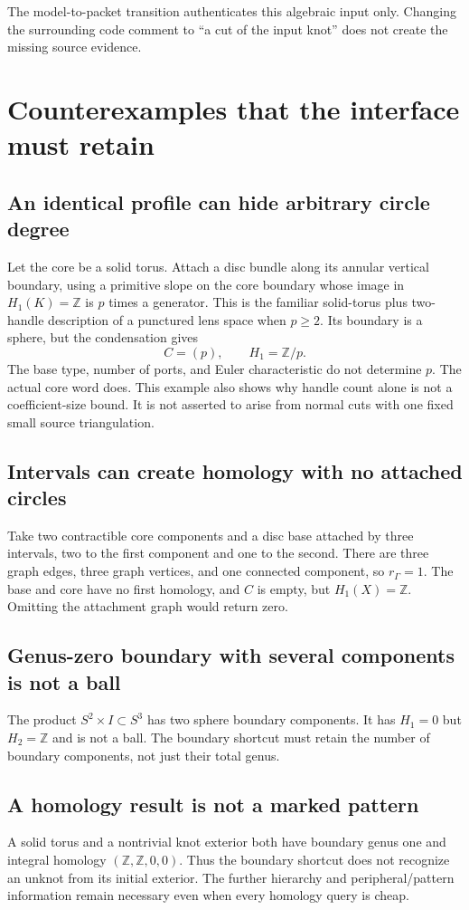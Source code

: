 \documentclass[11pt]{article}
\theoremstyle{definition}
\theoremstyle{remark}
\newcommand{\Z}{\mathbb Z}
\begin{document}
The model-to-packet transition authenticates this algebraic input only.
Changing the surrounding code comment to ``a cut of the input knot'' does
not create the missing source evidence.

\section{Counterexamples that the interface must retain}
\label{app:counterexamples}

\subsection{An identical profile can hide arbitrary circle degree}
Let the core be a solid torus. Attach a disc bundle along its annular
vertical boundary, using a primitive slope on the core boundary whose image
in $H_1(K)=\Z$ is $p$ times a generator. This is the familiar solid-torus plus
two-handle description of a punctured lens space when $p\geq2$. Its boundary
is a sphere, but the condensation gives
\[
 C=(p),\qquad H_1=\Z/p.
\]
The base type, number of ports, and Euler characteristic do not determine
$p$. The actual core word does. This example also shows why handle count
alone is not a coefficient-size bound. It is not asserted to arise from
normal cuts with one fixed small source triangulation.

\subsection{Intervals can create homology with no attached circles}
Take two contractible core components and a disc base attached by three
intervals, two to the first component and one to the second. There are three
graph edges, three graph vertices, and one connected component, so
$r_\Gamma=1$. The base and core have no first homology, and $C$ is empty,
but $H_1(X)=\Z$. Omitting the attachment graph would return zero.

\subsection{Genus-zero boundary with several components is not a ball}
The product $S^2\times I\subset S^3$ has two sphere boundary components.
It has $H_1=0$ but $H_2=\Z$ and is not a ball. The boundary shortcut must
retain the number of boundary components, not just their total genus.

\subsection{A homology result is not a marked pattern}
A solid torus and a nontrivial knot exterior both have boundary genus one
and integral homology $(\Z,\Z,0,0)$. Thus the boundary shortcut does not
recognize an unknot from its initial exterior. The further hierarchy and
peripheral/pattern information remain necessary even when every homology
query is cheap.
\end{document}
